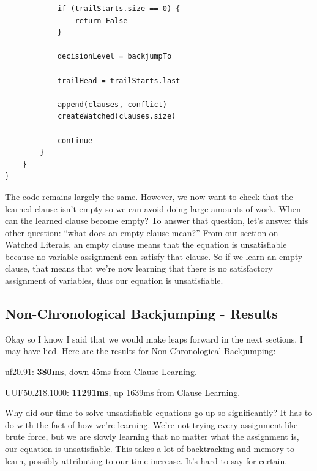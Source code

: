 \documentclass[../main.tex]{subfiles}
\begin{document}
\begin{lstlisting}
            if (trailStarts.size == 0) {
                return False
            }

            decisionLevel = backjumpTo

            trailHead = trailStarts.last

            append(clauses, conflict)
            createWatched(clauses.size)

            continue
        }
    }
}
\end{lstlisting}

The code remains largely the same. However, we now want to check that the learned clause isn't empty
so we can avoid doing large amounts of work. When can the learned clause become empty? To answer 
that question, let's answer this other question: ``what does an empty clause mean?'' From our 
section on Watched Literals, an empty clause means that the equation is unsatisfiable because 
no variable assignment can satisfy that clause. So if we learn an empty clause, that means that 
we're now learning that there is no satisfactory assignment of variables, thus our equation is 
unsatisfiable.

\subsection{Non-Chronological Backjumping - Results}
Okay so I know I said that we would make leaps forward in the next sections.
I may have lied. Here are the results for Non-Chronological Backjumping:

\noindent
uf20.91: \textbf{380ms}, down 45ms from Clause Learning.

\noindent
UUF50.218.1000: \textbf{11291ms}, up 1639ms from Clause Learning.

Why did our time to solve unsatisfiable equations go up so significantly? It has to do 
with the fact of how we're learning. We're not trying every assignment like brute force, but 
we are slowly learning that no matter what the assignment is, our equation is unsatisfiable. 
This takes a lot of backtracking and memory to learn, possibly attributing to our time increase.
It's hard to say for certain.
\end{document}
